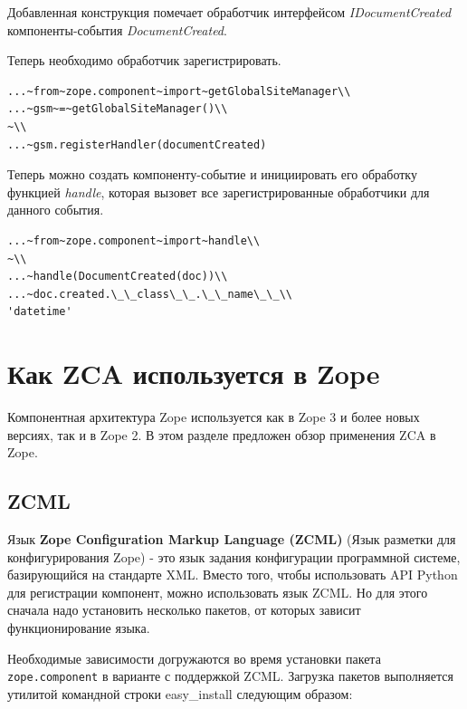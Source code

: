 \documentclass[a4paper,openany,twoside,draft]{book}
\providecommand*{\DUroletitlereference}[1]{\textsl{#1}}
\begin{document}
Добавленная конструкция помечает обработчик интерфейсом
\DUroletitlereference{IDocumentCreated} компоненты-события \DUroletitlereference{DocumentCreated}.

Теперь необходимо обработчик зарегистрировать.

\begin{verbatim}
...~from~zope.component~import~getGlobalSiteManager\\
...~gsm~=~getGlobalSiteManager()\\
~\\
...~gsm.registerHandler(documentCreated)
\end{verbatim}

Теперь можно создать компоненту-событие и инициировать его обработку
функцией \DUroletitlereference{handle}, которая вызовет все зарегистрированные обработчики
для данного события.

\begin{verbatim}
...~from~zope.component~import~handle\\
~\\
...~handle(DocumentCreated(doc))\\
...~doc.created.\_\_class\_\_.\_\_name\_\_\\
'datetime'
\end{verbatim}


\chapter{Как ZCA используется в Zope%
  \label{zca-zope}%
}

Компонентная архитектура Zope используется как в Zope 3 и более новых
версиях, так и в Zope 2.  В этом разделе предложен обзор применения
ZCA в Zope.


\section{ZCML%
  \label{zcml}%
}

Язык \textbf{Zope Configuration Markup Language (ZCML)} (Язык разметки для
конфигурирования Zope) - это язык задания конфигурации программной
системе, базирующийся на стандарте XML.  Вместо того, чтобы
использовать API Python для регистрации компонент, можно использовать
язык ZCML.  Но для этого сначала надо установить несколько пакетов, от
которых зависит функционирование языка.

Необходимые зависимости догружаются во время установки пакета
\texttt{zope.component} в варианте с поддержкой ZCML.  Загрузка пакетов
выполняется утилитой командной строки easy\_install следующим образом:
\end{document}
